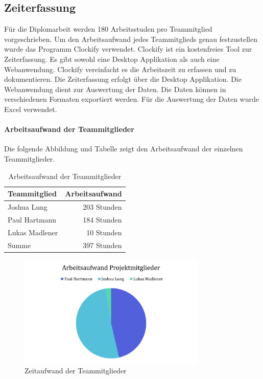 \subsection{Zeiterfassung}
Für die Diplomarbeit werden 180 Arbeitsstuden pro Teammitglied vorgeschrieben. Um den Arbeitsaufwand jedes Teammitglieds genau festzustellen wurde das Programm Clockify verwendet. Clockify ist ein kostenfreies Tool zur Zeiterfassung. Es gibt sowohl eine Desktop Applikation als auch eine Webanwendung. Clockify vereinfacht es die Arbeitszeit zu erfassen und zu dokumentieren. Die Zeiterfassung erfolgt über die Desktop Applikation. Die Webanwendung dient zur Auswertung der Daten. Die Daten können in verschiedenen Formaten exportiert werden. Für die Auswertung der Daten wurde Excel verwendet.


\paragraph{Arbeitsaufwand der Teammitglieder}
Die folgende Abbildung und Tabelle zeigt den Arbeitsaufwand der einzelnen Teammitglieder.

\begin{table}[!h]
  \centering
  \begin{tabular}{lr}
    \toprule
    \textbf{Teammitglied} & \textbf{Arbeitsaufwand} \\
    \midrule
    Joshua Lung           & 203 Stunden             \\
    Paul Hartmann         & 184 Stunden             \\
    Lukas Madlener        & 10 Stunden              \\
    \midrule
    Summe                 & 397 Stunden             \\
    \bottomrule
  \end{tabular}
  \caption{Arbeitsaufwand der Teammitglieder}
  \label{tab:zeiterfassung_teammitglieder}
\end{table}

\begin{figure}[!ht]
  \centering
  \includegraphics[width=0.8\textwidth]{images/zeiterfassung_teammitglieder.png}
  \caption{Zeitaufwand der Teammitglieder}
  \label{fig:zeiterfassung_teammitglieder}
\end{figure}


